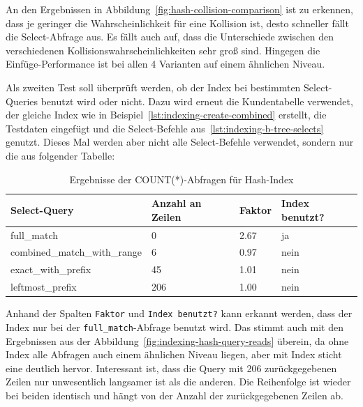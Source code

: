An den Ergebnissen in Abbildung~\ref{fig:hash-collision-comparison} ist zu erkennen, dass je geringer die Wahrscheinlichkeit für eine Kollision ist, desto schneller fällt die Select-Abfrage aus.
Es fällt auch auf, dass die Unterschiede zwischen den verschiedenen Kollisionswahrscheinlichkeiten sehr groß sind.
Hingegen die Einfüge-Performance ist bei allen 4 Varianten auf einem ähnlichen Niveau.

Als zweiten Test soll überprüft werden, ob der Index bei bestimmten Select-Queries benutzt wird oder nicht.
Dazu wird erneut die Kundentabelle verwendet, der gleiche Index wie in Beispiel~\ref{lst:indexing-create-combined} erstellt, die Testdaten eingefügt und die Select-Befehle aus~\ref{lst:indexing-b-tree-selects} genutzt.
Dieses Mal werden aber nicht alle Select-Befehle verwendet, sondern nur die aus folgender Tabelle:

\vspace{-4pt}
\begin{table}[H]
    \centering
    \scriptsize
    \begin{tabular}{|l|l|l|l|}
        \hline
        \textbf{Select-Query} & \textbf{Anzahl an Zeilen} & \textbf{Faktor} & \textbf{Index benutzt?} \\
        \hline
        full\_match & 0 & 2.67 & ja \\
        combined\_match\_with\_range & 6 & 0.97 & nein \\
        exact\_with\_prefix & 45 & 1.01 & nein \\
        leftmost\_prefix & 206 & 1.00 & nein \\
        \hline
    \end{tabular}
    \vspace{3pt}
    \caption{Ergebnisse der COUNT(*)-Abfragen für Hash-Index}
    \label{tab:indexing_hash_count_results}
\end{table}
\vspace{-30pt}

Anhand der Spalten \texttt{Faktor} und \texttt{Index benutzt?} kann erkannt werden, dass der Index nur bei der \texttt{full\_match}-Abfrage benutzt wird.
Das stimmt auch mit den Ergebnissen aus der Abbildung~\ref{fig:indexing-hash-query-reads} überein, da ohne Index alle Abfragen auch einem ähnlichen Niveau liegen, aber mit Index sticht eine deutlich hervor.
Interessant ist, dass die Query mit 206 zurückgegebenen Zeilen nur unwesentlich langsamer ist als die anderen.
Die Reihenfolge ist wieder bei beiden identisch und hängt von der Anzahl der zurückgegebenen Zeilen ab.

